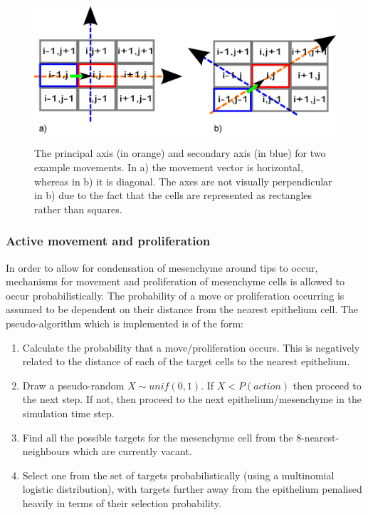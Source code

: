 \documentclass[pdftex,10pt,a4paper,twocolumn]{article}
\begin{document}
\begin{figure}[t] 
\centering
\scalebox{0.35} 
{\includegraphics{axes.eps}}
\caption{The principal axis (in orange) and secondary axis (in blue) for two example movements. In a) the movement vector is horizontal, whereas in b) it is diagonal. The axes are not visually perpendicular in b) due to the fact that the cells are represented as rectangles rather than squares.}\label{fig:axes}
\end{figure} 

\subsubsection{Active movement and proliferation}
In order to allow for condensation of mesenchyme around tips to occur, mechanisms for movement and proliferation of mesenchyme cells is allowed to occur probabilistically. The probability of a move or proliferation occurring is assumed to be dependent on their distance from the nearest epithelium cell. The pseudo-algorithm which is implemented is of the form:

\begin{enumerate}
\item Calculate the probability that a move/proliferation occurs. This is negatively related to the distance of each of the target cells to the nearest epithelium.\label{point:mesactive}
\item Draw a pseudo-random $X\sim unif(0,1)$. If $X<P(action)$ then proceed to the next step. If not, then proceed to the next epithelium/mesenchyme in the simulation time step.
\item Find all the possible targets for the mesenchyme cell from the 8-nearest-neighbours which are currently vacant. 
\item Select one from the set of targets probabilistically (using a multinomial logistic distribution), with targets further away from the epithelium penalised heavily in terms of their selection probability.\label{point:mesactive1}
\end{enumerate}
\end{document}
